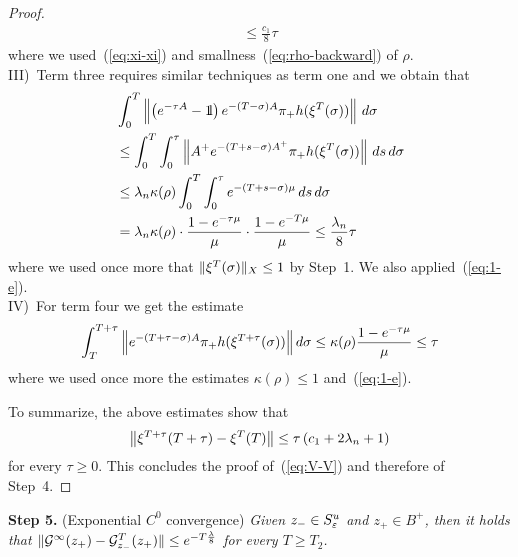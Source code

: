 \documentclass{article}
\begin{document}
\begin{proof}
\begin{equation*}
\begin{split}
     \le\frac{{c_1}}{8}\tau
\end{split}
\end{equation*}
where we used~(\ref{eq:xi-xi}) and smallness~(\ref{eq:rho-backward}) of $\rho$.
\\
III)~Term three requires similar techniques as term one and we obtain that
\begin{equation*}
\begin{split}
   &\int_0^T\Norm{\left(e^{-\tau A}-\1\right) e^{-(T-\sigma)A}\pi_+ h(\xi^T(\sigma))}\, d\sigma
   \\
    &\le\int_0^T\int_0^\tau\Norm{A^+ e^{-(T+s-\sigma)A^+}\pi_+ h(\xi^T(\sigma))}\, ds\, d\sigma
   \\
    &\le\lambda_n\kappa(\rho)\int_0^T\int_0^\tau e^{-(T+s-\sigma)\mu}\, ds\, d\sigma
   \\
    &=\lambda_n\kappa(\rho)\cdot\frac{1-e^{-\tau\mu}}{\mu}\cdot\frac{1-e^{-T\mu}}{\mu}
     \le\frac{\lambda_n}{8}\tau
\end{split}
\end{equation*}
where we used once more that $\mathopen\|\xi^T(\sigma)\mathclose\|_X\le 1$ by
Step~1. We also applied~(\ref{eq:1-e}).
\\
IV)~For term four we get the estimate
\begin{equation*}
     \int_T^{T+\tau}\left\| e^{-(T+\tau-\sigma)A}\pi_+h(\xi^{T+\tau}(\sigma))\right\| d\sigma
     \le\kappa(\rho)\frac{1-e^{-\tau\mu}}{\mu}
     \le \tau
\end{equation*}
where we used once more the estimates $\kappa(\rho)\le1$ and~(\ref{eq:1-e}).

To summarize, the above estimates show that
\begin{equation}\label{eq:xi-xi-T-tau}
     \Norm{\xi^{T+\tau}(T+\tau)-\xi^T(T)}
     \le\tau \left(c_1+2\lambda_n+1\right)
\end{equation}
for every $\tau\ge0$. This concludes the proof of~(\ref{eq:V-V})
and therefore of Step~4.
\end{proof}

\noindent
{\bf Step 5.} (Exponential $C^0$ convergence)
{\it Given ${z_-}\in S^u_{\varepsilon}$ and
$z_+\in B^+$, then it holds that
$
     \mathopen\|{\mathcal{G}}^\infty(z_+)
     -{\mathcal{G}}_{z_-}^T(z_+)\mathclose\|
     \le e^{-T\frac{\lambda}{8}}
$
for every $T\ge T_2$.
}
\end{document}
